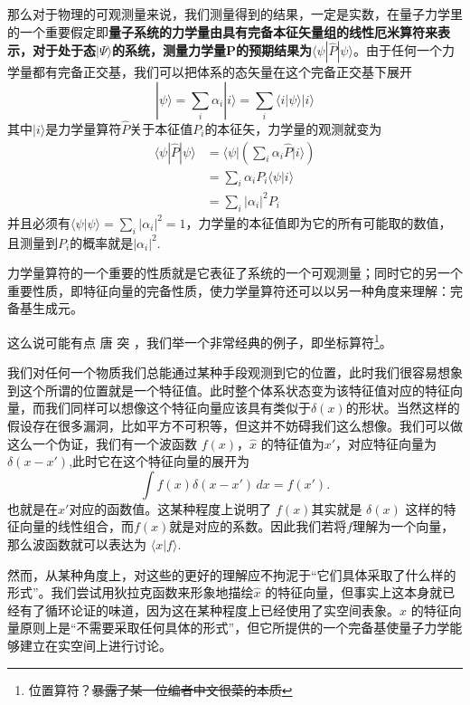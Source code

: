 \documentclass[12pt,a4paper,openany,twoside]{book}
\numberwithin{equation}{section}
\begin{document}
  那么对于物理的可观测量来说，我们测量得到的结果，一定是实数，在量子力学里的一个重要假定即\textbf{量子系统的力学量由具有完备本征矢量组的线性厄米算符来表示，对于处于态}$ | \Psi \rangle $\textbf{的系统，测量力学量P的预期结果为}$ \langle\psi|\hat P| \psi\rangle$。由于任何一个力学量都有完备正交基，我们可以把体系的态矢量在这个完备正交基下展开
  \begin{equation}
    | \psi \rangle=\sum_{i} \alpha_{i} | i \rangle=\sum_{i}\langle i | \psi\rangle | i \rangle
  \end{equation}
  其中$ | i \rangle $是力学量算符$\hat{P}$关于本征值$P_i$的本征矢，力学量的观测就变为
  \begin{equation}
    \begin{aligned}\langle\psi|\hat{P}| \psi\rangle &=\langle\psi |\left(\sum_{i} \alpha_{i} \hat{P} | i\rangle\right) \\ &=\sum_{i} \alpha_{i} P_{i}\langle\psi | i\rangle \\ &=\sum_{i}\left|\alpha_{i}\right|^{2} P_{i} \end{aligned}
  \end{equation}
  并且必须有$\langle\psi | \psi\rangle=\sum_{i}\left|\alpha_{i}\right|^{2}=1$，力学量的本征值即为它的所有可能取的数值，且测量到$P_i$的概率就是$|\alpha_i|^2$.

  力学量算符的一个重要的性质就是它表征了系统的一个可观测量；同时它的另一个重要性质，即特征向量的完备性质，使力学量算符还可以以另一种角度来理解：完备基生成元。

  这么说可能有点 唐 突 ，我们举一个非常经典的例子，即坐标算符\footnote{位置算符？\sout{暴露了某一位编者中文很菜的本质}}。

	  我们对任何一个物质我们总能通过某种手段观测到它的位置，此时我们很容易想象到这个所谓的位置就是一个特征值。此时整个体系状态变为该特征值对应的特征向量，而我们同样可以想像这个特征向量应该具有类似于$\delta (x)$的形状。当然这样的假设存在很多漏洞，比如平方不可积等，但这并不妨碍我们这么想像。我们可以做这么一个伪证，我们有一个波函数 $f(x)$，$\hat{x}$ 的特征值为$x'$，对应特征向量为 $\delta(x-x')$,此时它在这个特征向量的展开为
	  \[
		  \int f(x) \delta(x-x') \, dx = f(x')
	  .\] 
	  也就是在$x'$对应的函数值。这某种程度上说明了 $f(x)$其实就是 $\delta(x)$ 这样的特征向量的线性组合，而$f(x)$就是对应的系数。因此我们若将$f$理解为一个向量，那么波函数就可以表达为 $\langle x | f \rangle $.

	  然而，从某种角度上，对这些的更好的理解应不拘泥于``它们具体采取了什么样的形式''。我们尝试用狄拉克函数来形象地描绘$\hat{x}$ 的特征向量，但事实上这本身就已经有了循环论证的味道，因为这在某种程度上已经使用了实空间表象。$\hat{x}$ 的特征向量原则上是``不需要采取任何具体的形式''，但它所提供的一个完备基使量子力学能够建立在实空间上进行讨论。
\end{document}
